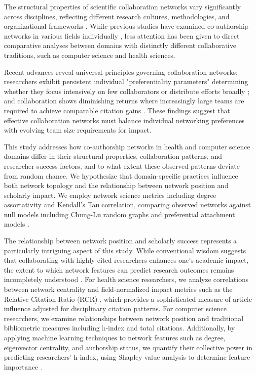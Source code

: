 \documentclass[9pt,twocolumn,twoside]{pnas-new}
\begin{document}
 \noindent The structural properties of scientific collaboration networks vary significantly across disciplines, reflecting different research cultures, methodologies, and organizational frameworks \cite{wagner2011approaches}. While previous studies have examined co-authorship networks in various fields individually \cite{gonzalez2015evolution, newman2004coauthorship}, less attention has been given to direct comparative analyses between domains with distinctly different collaborative traditions, such as computer science and health sciences.
 \newline
 
\noindent Recent advances reveal universal principles governing collaboration networks: researchers exhibit persistent individual "preferentiality parameters" determining whether they focus intensively on few collaborators or distribute efforts broadly \cite{iniquez2023universal}; and collaboration shows diminishing returns where increasingly large teams are required to achieve comparable citation gains \cite{lariviere2015team}. These findings suggest that effective collaboration networks must balance individual networking preferences with evolving team size requirements for impact.
\newline

 \noindent This study addresses how co-authorship networks in health and computer science domains differ in their structural properties, collaboration patterns, and researcher success factors, and to what extent these observed patterns deviate from random chance. We hypothesize that domain-specific practices influence both network topology and the relationship between network position and scholarly impact. We employ network science metrics including degree assortativity and Kendall's Tau correlation, comparing observed networks against null models including Chung-Lu random graphs and preferential attachment models \cite{barabasi2002evolution, 
jeong2003measuring, Litvak}.
\newline

 \noindent The relationship between network position and scholarly success represents a particularly intriguing aspect of this study. While conventional wisdom suggests that collaborating with highly-cited researchers enhances one's academic impact, the extent to which network features can predict research outcomes remains incompletely understood \cite{abbasi2011identifying, yan2012scholarly}. For health science researchers, we analyze correlations between network centrality and field-normalized impact metrics such as the Relative Citation Ratio (RCR) \cite{hutchins2016relative}, which provides a sophisticated measure of article influence adjusted for disciplinary citation patterns. For computer science researchers, we examine relationships between network position and traditional bibliometric measures including h-index and total citations. Additionally, by applying machine learning techniques to network features such as degree, eigenvector centrality, and authorship status, we quantify their collective power in predicting researchers' h-index, using Shapley value analysis to determine feature importance \cite{rozemberczki2022shapley}.
\newline
\end{document}
